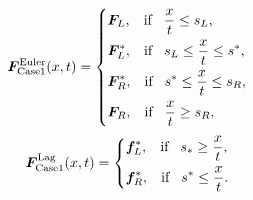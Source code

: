 \documentclass{article}
\numberwithin{equation}{section}
\numberwithin{table}{section}
\begin{document}
 \begin{equation}
	\bm{F}^{\text{Euler}}_{\text{Case1}}(x,t) = \left\{ \begin{aligned}
		& \bm{F}_L, \hspace{0.3cm} \text{if} \hspace{0.3cm} \frac{x}{t}\le s_L, \\
		& \bm{F}_L^*, \hspace{0.3cm} \text{if} \hspace{0.3cm} s_L\le \frac{x}{t} \le s^*, \\
		& \bm{F}_R^*, \hspace{0.3cm} \text{if} \hspace{0.3cm} s^*\le \frac{x}{t} \le s_R,\\
		& \bm{F}_R, \hspace{0.3cm} \text{if} \hspace{0.3cm} \frac{x}{t}\ge s_R, \\
	  \end{aligned}
	\right.
  \end{equation}
\begin{equation}
	\bm{F}^{\text{Lag}}_{\text{Case1}}(x,t) = \left\{ \begin{aligned}
		& \bm{f}_L^*, \hspace{0.3cm} \text{if} \hspace{0.3cm} s_*\ge \frac{x}{t},\\
		& \bm{f}_R^*, \hspace{0.3cm} \text{if} \hspace{0.3cm} s^*\le \frac{x}{t}.\\
	  \end{aligned}
	\right.
  \end{equation}
\end{document}
